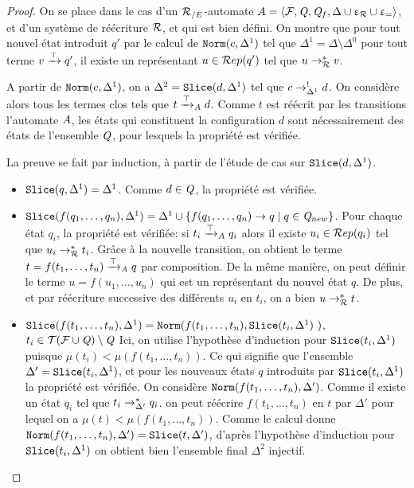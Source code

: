 \begin{proof}
  On se place dans le cas d'un ${\mathcal R_{/E}}$-automate $A = \langle \mathcal{F}, \mathit Q, \mathit Q_f, \Delta \cup \upvarepsilon_{\mathcal R} \cup \upvarepsilon_{=}\rangle$, et d'un système de réécriture $\mathcal R$,
  et qui est bien défini.
  On montre que pour tout nouvel état introduit $q'$  par le calcul de $\mathtt{Norm}(c, \Delta^1)$ tel que $\Delta^1 = \Delta \setminus \Delta^0$
  pour tout terme $v \xrightarrow{\top} q'$, il existe un représentant $u \in \mathcal R ep(q')$ tel que $u \rightarrow^*_\mathcal R v$.

  A partir de $\mathtt{Norm}(c, \Delta^1)$, on a $\Delta^2 = \mathtt{Slice}(d, \Delta^1)$ tel que $c \rightarrow^!_{\Delta^1} d$.
  On considère alors tous les termes clos tels que $t \xrightarrow{\top}_\mathit A d$. Comme $t$ est réécrit par les transitions 
  l'automate $\mathit A$, les états qui constituent la configuration $d$ sont nécessairement des états de l'ensemble $\mathit Q$,
  pour lesquels la propriété est vérifiée.
  
  La preuve se fait par induction, à partir de l'étude de cas sur $\mathtt{Slice}(d, \Delta^1)$. 
  \begin{itemize}
  \item $\mathtt{Slice}(q, \Delta^1) = \Delta^1$. Comme $d \in \mathit Q$, la propriété est vérifiée.

  \item $\mathtt{Slice}(f(q_1, \dots, q_n), \Delta^1) = \Delta^1 \cup \{ f(q_1, \dots, q_n) \rightarrow q \; | \; q \in \mathit Q_{new}\}$. 
    Pour chaque état $q_i$, la propriété est vérifiée: si $t_i \xrightarrow{\top}_\mathit A q_i$ alors il existe $u_i \in \mathcal R ep(q_i)$
    tel que $u_i \rightarrow_\mathcal R^* t_i$. Grâce à la nouvelle transition, on obtient le terme $t = f(t_1, \dots, t_n) \xrightarrow{\top}_\mathit A q$ par composition.
    De la même manière, on peut définir le terme $u = f(u_1, \dots, u_n)$ qui est un représentant du nouvel état $q$.
    De plus, et par réécriture successive des différents $u_i$ en $t_i$, on a bien $u \rightarrow^*_\mathcal R t$.

  \item $\mathtt{Slice}(f(t_1, \dots, t_n), \Delta^1) = \mathtt{Norm}(f(t_1,\dots, t_n), \mathtt{Slice}(t_i, \Delta^1)\ )$, $t_i \in \mathcal{ T(F \cup \mathit Q)} \setminus \mathit Q$
    Ici, on utilise l'hypothèse d'induction pour $\mathtt{Slice}(t_i, \Delta^1)$ puisque $\mu (t_i) < \mu(f(t_1, \dots, t_n))$.
    Ce qui signifie que l'ensemble $\Delta' = \mathtt{Slice}(t_i, \Delta^1)$, et pour les nouveaux états $q$ introduits par $\mathtt{Slice}(t_i, \Delta^1)$
    la propriété est vérifiée.
    On considère $\mathtt{Norm}(f(t_1,\dots, t_n), \Delta')$. Comme il existe un état $q_i$ tel que $t_i \rightarrow^*_{\Delta'} q_i$. on peut 
    réécrire $f(t_1,\dots, t_n)$ en $t$ par $\Delta'$ pour lequel on a $\mu (t) < \mu(f(t_1, \dots, t_n))$. Comme 
    le calcul donne $\mathtt{Norm}(f(t_1,\dots, t_n), \Delta') = \mathtt{Slice}(t, \Delta')$, d'après l'hypothèse d'induction 
    pour $\mathtt{Slice}(t_i, \Delta^1)$ on obtient bien l'ensemble final $\Delta^2$ injectif.
  \end{itemize}
\end{proof}



